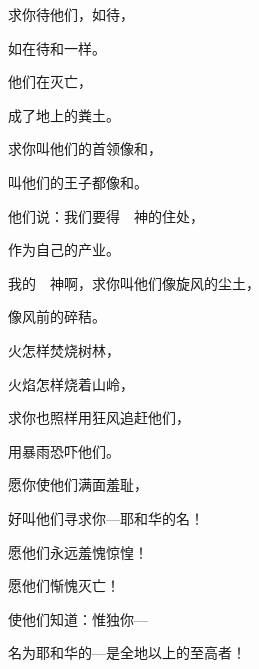 {\Q {}求你待他们，如待{}，
\par }{\Q 如在{}待{}和{}一样。
\par }{\Q {}他们在{}灭亡，
\par }{\Q 成了地上的粪土。
\par }{\Q {}求你叫他们的首领像{}和{}，
\par }{\Q 叫他们的王子都像{}和{}。
\par }{\Q {}他们说：我们要得　神的住处，
\par }{\Q 作为自己的产业。
\par }{\BB \par }{\Q {}我的　神啊，求你叫他们像旋风的尘土，
\par }{\Q 像风前的碎秸。
\par }{\Q {}火怎样焚烧树林，
\par }{\Q 火焰怎样烧着山岭，
\par }{\Q {}求你也照样用狂风追赶他们，
\par }{\Q 用暴雨恐吓他们。
\par }{\Q {}愿你使他们满面羞耻，
\par }{\Q 好叫他们寻求你—耶和华的名！
\par }{\Q {}愿他们永远羞愧惊惶！
\par }{\Q 愿他们惭愧灭亡！
\par }{\Q {}使他们知道：惟独你—
\par }{\Q 名为耶和华的—是全地以上的至高者！

\par }
